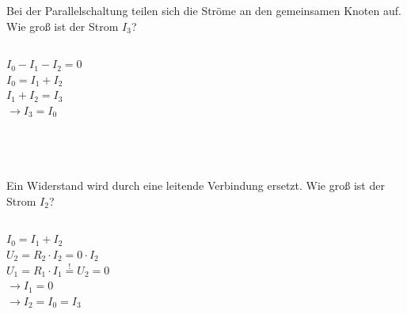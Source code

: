\begin{frame}
{\begin{columns}

			Bei der Parallelschaltung teilen sich die Ströme an den gemeinsamen
			Knoten auf. Wie groß ist der Strom $I_3$?\\



			

		\end{columns}
		\begin{columns}
			\vspace{-50pt}




			\pause


			$I_0-I_1-I_2 = 0$\\
			$I_0 = I_1 + I_2$\\
			$I_1+I_2 = I_3$\\
			$\rightarrow I_3 = I_0$

			\pause


			\phantom{.}

		\end{columns}

		\phantom{.}\\
		\begin{columns}
			\column[t]{0.6\textwidth}
			\vspace{-10pt}


			Ein Widerstand wird durch eine leitende Verbindung ersetzt.
			Wie groß ist der Strom $I_2$?\\

			\column[t]{0.4\textwidth}

			

		\end{columns}
		\begin{columns}


			\pause
			\vspace{-55pt}
			$I_0 = I_1 + I_2$\\

			$U_2 = R_2 \cdot I_2 = 0 \cdot I_2$\\
			$U_1 = R_1 \cdot I_1  \stackrel{!}{=} U_2 =0 $\\
			$\rightarrow I_1 =0$\\
			$\rightarrow I_2 = I_0 = I_3$


\end{columns}}
\end{frame}
